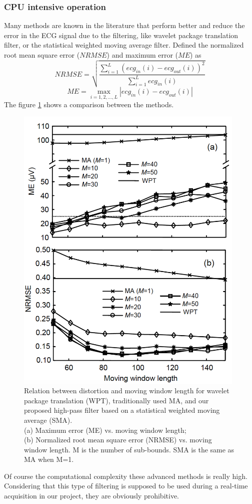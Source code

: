 \subsubsection{CPU intensive operation}
Many methods are known in the literature that perform better and reduce the error in the ECG signal due to the filtering, like wavelet package translation filter\cite{ref16}, or the statistical weighted moving average filter\cite{ref17}. Defined the normalized root mean square error ($NRMSE$) and maximum error ($ME$) as
\begin{equation}
NRMSE=\sqrt{\frac{\sum_{i=1}^{L}(ecg_{in}(i)-ecg_{out}(i))^2}{\sum_{i=1}^{L}ecg_{in}(i)}}\end{equation}
\begin{equation}
ME=\max_{i=1,2,\dots,L}|ecg_{in}(i)-ecg_{out}(i)|
\end{equation}
The figure \ref{fig6.6} shows a comparison between the methods.
\begin{figure}[ht!]
	\centering
	\includegraphics[width=110mm]{figures/ch6/6.png}
	\caption{Relation between distortion and moving window length for wavelet package translation (WPT), traditionally used MA, and our proposed high-pass filter based on a statistical weighted moving average (SMA).\\
		(a) Maximum error (ME) vs. moving window length;\\
		(b) Normalized root mean square error (NRMSE) vs. moving window length. M is the number of sub-bounds. SMA is the same as MA when M=1.}
	\label{fig6.6}
\end{figure}
Of course the computational complexity these advanced methods is really high. Considering that this type of filtering is supposed to be used during a real-time acquisition in our project, they are obviously prohibitive.

